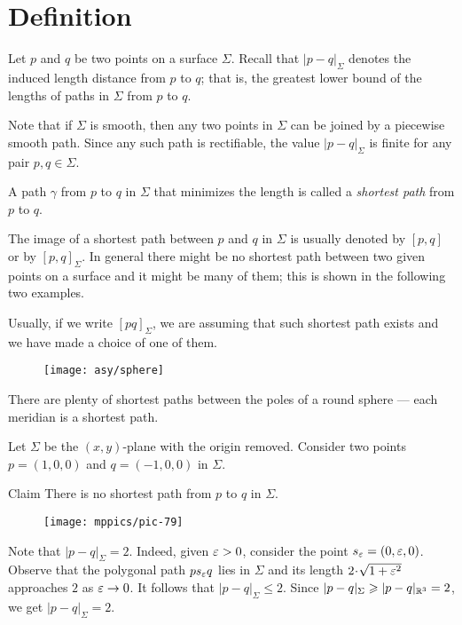 \section{Definition}

Let $p$ and $q$ be two points on a surface $\Sigma$.
Recall that $|p-q|_\Sigma$ denotes the induced length distance from $p$ to $q$;
that is, the greatest lower bound of the lengths of paths in $\Sigma$ from $p$ to $q$.

Note that if $\Sigma$ is smooth, then any two points in $\Sigma$ can be joined by a piecewise smooth path.
Since any such path is rectifiable, the value $|p-q|_\Sigma$ is finite for any pair $p,q\in\Sigma$.

A path $\gamma$ from $p$ to $q$ in $\Sigma$ that minimizes the length is called a \emph{shortest path} from $p$ to $q$.

The image of a shortest path between $p$ and $q$ in $\Sigma$ is usually denoted by $[p,q]$ or by $[p,q]_\Sigma$.
In general there might be no shortest path between two given points on a surface and it might be many of them;
this is shown in the following two examples.

Usually, if we write $[pq]_\Sigma$, we are assuming that such shortest path exists and we have made a choice of one of them.

{

\begin{wrapfigure}{r}{28 mm}
\vskip-6mm
\centering
\texttt{[image: asy/sphere]}
\end{wrapfigure}

 There are plenty of shortest paths between the poles of a round sphere --- each meridian is a shortest path.

 Let $\Sigma$ be the $(x,y)$-plane with the origin removed.
Consider two points $p=(1,0,0)$ and $q=(-1,0,0)$ in $\Sigma$.

}

\begin{thm}{Claim}
There is no shortest path from $p$ to $q$ in $\Sigma$.
\end{thm}

\begin{wrapfigure}{r}{28 mm}
\vskip-4mm
\centering
\texttt{[image: mppics/pic-79]}
\end{wrapfigure}

Note that $|p-q|_\Sigma=2$. 
Indeed, given $\eps\z>0$, consider the point $s_\varepsilon=(0,\varepsilon,0)$.
Observe that the polygonal path $ps_\varepsilon q$ lies in $\Sigma$ and its length $2\cdot\sqrt{1+\eps^2}$ approaches $2$ as $\varepsilon\to0$.
It follows that $|p-q|_\Sigma\le 2$.
Since $|p-q|_\Sigma\geqslant |p-q|_{\mathbb{R}^3}=2$, we get $|p-q|_\Sigma=2$.



